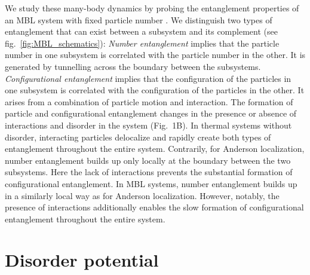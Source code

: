 We study these many-body dynamics by probing the entanglement properties of an MBL system with fixed particle number \cite{ Znidaric2008, Bardarson2012, Serbyn2013, Serbyn2013b, Huse2014}. We distinguish two types of entanglement that can exist between a subsystem and its complement (see fig.~\ref{fig:MBL_schematics}): \textit{Number entanglement} implies that the particle number in one subsystem is correlated with the particle number in the other. It is generated by tunnelling across the boundary between the subsystems. \textit{Configurational entanglement} implies that the configuration of the particles in one subsystem is correlated with the configuration of the particles in the other. It arises from a combination of particle motion and interaction. The formation of particle and configurational entanglement changes in the presence or absence of interactions and disorder in the system (Fig.~1B). In thermal systems without disorder, interacting particles delocalize and rapidly create both types of entanglement throughout the entire system. Contrarily, for Anderson localization, number entanglement builds up only locally at the boundary between the two subsystems. Here the lack of interactions prevents the substantial formation of configurational entanglement. In MBL systems, number entanglement builds up in a similarly local way as for Anderson localization. However, notably, the presence of interactions additionally enables the slow formation of configurational entanglement throughout the entire system. 

\section{Disorder potential}

